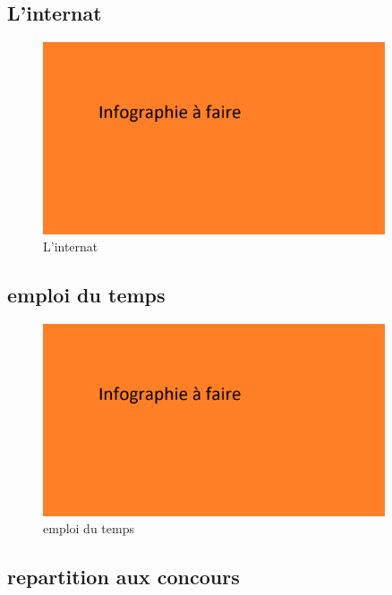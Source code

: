 \documentclass[aspectratio=169]{beamer}
\begin{document}
\subsection{L'internat}

\begin{frame}
    \begin{figure}
        \centering
        \includegraphics[width=0.9\textwidth]{ressource_diapo/place older.png}
        \caption{L'internat}
    \end{figure}
\end{frame}

\subsection{emploi du temps}

\begin{frame}
    \begin{figure}
        \centering
        \includegraphics[width=0.9\textwidth]{ressource_diapo/place older.png}
        \caption{emploi du temps}
    \end{figure}
\end{frame}

\subsection{repartition aux concours}
\end{document}
